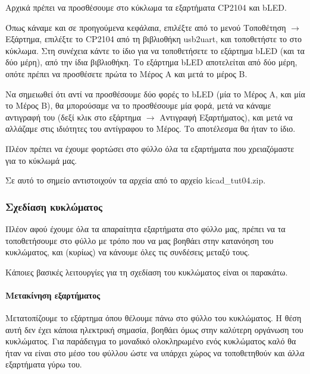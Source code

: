 \documentclass[a4paper]{article}
\begin{document}
Αρχικά πρέπει να προσθέσουμε στο κύκλωμα τα εξαρτήματα \textenglish{CP2104} και b\textenglish{LED}. 

Όπως κάναμε και σε προηγούμενα κεφάλαια, επιλέξτε από το μενού Τοποθέτηση $\rightarrow$ Εξάρτημα, επιλέξτε το \textenglish{CP2104} από τη βιβλιοθήκη usb2uart, και τοποθετήστε το στο κύκλωμα. Στη συνέχεια κάντε το ίδιο για να τοποθετήσετε το εξάρτημα b\textenglish{LED} (και τα δύο μέρη), από την ίδια βιβλιοθήκη. Το εξάρτημα b\textenglish{LED} αποτελείται από δύο μέρη, οπότε πρέπει να προσθέσετε πρώτα το Μέρος Α και μετά το μέρος Β.

Να σημειωθεί ότι αντί να προσθέσουμε δύο φορές το b\textenglish{LED} (μία το Μέρος Α, και μία το Μέρος Β), θα μπορούσαμε να το προσθέσουμε μία φορά, μετά να κάναμε αντιγραφή του (δεξί κλικ στο εξάρτημα $\rightarrow$ Αντιγραφή Εξαρτήματος), και μετά να αλλάζαμε στις ιδιότητες του αντίγραφου το Μέρος. Το αποτέλεσμα θα ήταν το ίδιο.

Πλέον πρέπει να έχουμε φορτώσει στο φύλλο όλα τα εξαρτήματα που χρειαζόμαστε για το κύκλωμά μας.

\begin{figure}
  \begin{center}
    \label{fig:kicad-main}
  \end{center}
\end{figure}

Σε αυτό το σημείο αντιστοιχούν τα αρχεία από το αρχείο kicad\_tut04.zip.

\subsubsection{Σχεδίαση κυκλώματος}

Πλέον αφού έχουμε όλα τα απαραίτητα εξαρτήματα στο φύλλο μας, πρέπει να τα τοποθετήσουμε στο φύλλο με τρόπο που να μας βοηθάει στην κατανόηση του κυκλώματος, και (κυρίως) να κάνουμε όλες τις συνδέσεις μεταξύ τους.

Κάποιες βασικές λειτουργίες για τη σχεδίαση του κυκλώματος είναι οι παρακάτω.

\paragraph{Μετακίνηση εξαρτήματος}
Μετατοπίζουμε το εξάρτημα όπου θέλουμε πάνω στο φύλλο του κυκλώματος. Η θέση αυτή δεν έχει κάποια ηλεκτρική σημασία, βοηθάει όμως στην καλύτερη οργάνωση του κυκλώματος. Για παράδειγμα το μοναδικό ολοκληρωμένο ενός κυκλώματος καλό θα ήταν να είναι στο μέσο του φύλλου ώστε να υπάρχει χώρος να τοποθετηθούν και άλλα εξαρτήματα γύρω του.
\end{document}
